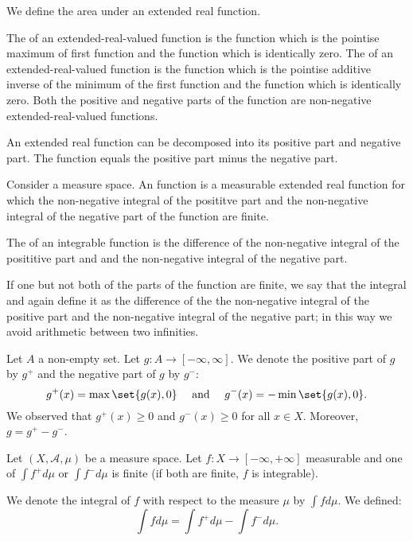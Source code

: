 
\sbasic



\sstart



We define the area
under an extended
real function.


The
of an extended-real-valued function
is the function which is the
pointise maximum of first
function and the function
which is identically zero.
The
of an extended-real-valued function
is the function which is the
pointise additive inverse
of the minimum of the first
function and
the function
which is identically zero.
Both the positive and
negative parts of the function
are non-negative
extended-real-valued
functions.

An extended real function
can be decomposed into
its positive part and
negative part.
The function equals
the positive part
minus the negative part.

Consider a measure space.
An
function
is a measurable
extended real function
for which
the non-negative integral
of the posititve part
and the non-negative integral
of the negative part of
the function are finite.

The 
of an integrable function
is the difference
of the non-negative integral
of the posititive part and
and the non-negative integral
of the negative part.

If one but not both
of the parts of the function
are finite, we say that the
integral
and again define it as
the difference of the
the non-negative integral
of the positive part and the
non-negative integral of the
negative part; in this
way we avoid arithmetic
between two infinities.


Let $A$ a non-empty set.
Let $g: A \to [-\infty, \infty]$.
We denote the positive part
of $g$ by $g^+$ and the negative
part of $g$ by $g^-$:
\[
  g^+(x) = \max\set{g(x), 0} \quad \text{ and } \quad g^-(x) = -\min\set{g(x), 0}.
\]
We observed that
$g^+(x) \geq 0$ and
$g^-(x) \geq 0$
for all $x \in X$.
Moreover,
$g = g^+ - g^-$.

Let $(X, \mathcal{A}, \mu)$
be a measure space.
Let $f: X \to [-\infty, +\infty]$
measurable and
one of
$\int f^+ d \mu$ or
$\int f^- d \mu$
is finite
(if both are finite,
$f$ is integrable).

We denote the integral
of $f$ with respect to the
measure $\mu$ by
$\int f d \mu$.
We defined:
\[
  \int f d\mu = \int f^+ d\mu - \int f^- d\mu.
\]

\strats
